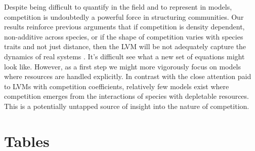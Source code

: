 \documentclass[a4paper,11pt]{article}
\begin{document}
Despite being difficult to quantify in the field and to represent in models, competition is undoubtedly a powerful force in structuring communities. Our results reinforce previous arguments that if competition is density dependent, non-additive across species, or if the shape of competition varies with species traits and not just distance, then the LVM will be not adequately capture the dynamics of real systems \citep{Andrewartha-1953, Neill-1974, Abrams-1975, Wangersky-1978,Abrams-1980, Tilman-1987}. It's difficult see what a new set of equations might look like. However, as a first step we might more vigorously focus on models where resources are handled explicitly. In contrast with the close attention paid to LVMs with competition coefficients, relatively few models exist where competition emerges from the interactions of species with depletable resources. This is a potentially untapped source of insight into the nature of competition.

\clearpage

\section{Tables}
\end{document}
